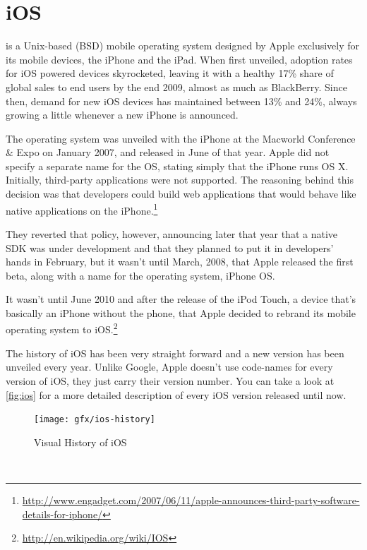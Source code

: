 \section{iOS}
 is a Unix-based (BSD) mobile operating system designed by Apple exclusively for its mobile devices, the iPhone and the iPad. When first unveiled, adoption rates for iOS powered devices skyrocketed, leaving it with a healthy 17\% share of global sales to end users by the end 2009, almost as much as BlackBerry. Since then, demand for new iOS devices has maintained between 13\% and 24\%, always growing a little whenever a new iPhone is announced.

The operating system was unveiled with the iPhone at the Macworld Conference \& Expo on January 2007, and released in June of that year. Apple did not specify a separate name for the \ac{OS}, stating simply that the iPhone runs OS X. Initially, third-party applications were not supported. The reasoning behind this decision was that developers could build web applications that would behave like native applications on the iPhone.\footnote{\url{http://www.engadget.com/2007/06/11/apple-announces-third-party-software-details-for-iphone/}} 

They reverted that policy, however, announcing later that year that a native \ac{SDK} was under development and that they planned to put it in developers' hands in February, but it wasn't until March, 2008, that Apple released the first beta, along with a name for the operating system, iPhone \ac{OS}.

It wasn't until June 2010 and after the release of the iPod Touch, a device that's basically an iPhone without the phone, that Apple decided to rebrand its mobile operating system to iOS.\footnote{\url{http://en.wikipedia.org/wiki/IOS}}

The history of iOS has been very straight forward and a new version has been unveiled every year. Unlike Google, Apple doesn't use code-names for every version of iOS, they just carry their version number. You can take a look at \autoref{fig:ios} for a more detailed description of every iOS version released until now.  

\begin{figure}[H]
    \begin{center}
        {\texttt{[image: gfx/ios-history]}}
        \caption[Visual History of iOS]{Visual History of iOS\footnotemark}\label{fig:ios}
    \end{center}
\end{figure}
\\

